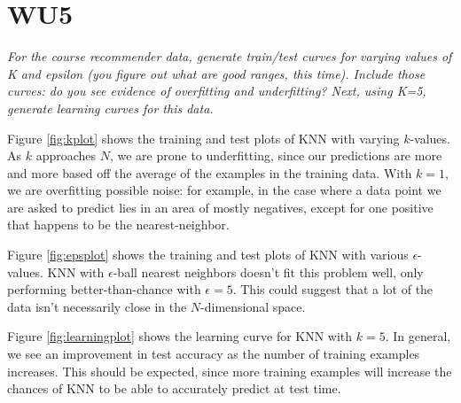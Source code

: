 \section*{WU5}

\textit{For the course recommender data, generate train/test curves for varying values of K and epsilon (you figure out what are good ranges, this time). Include those curves: do you see evidence of overfitting and underfitting? Next, using K=5, generate learning curves for this data.}

Figure \ref{fig:kplot} shows the training and test plots of KNN with varying $k$-values. As $k$ approaches $N$, we are prone to underfitting, since our predictions are more and more based off the average of the examples in the training data. With $k=1$, we are overfitting possible noise: for example, in the case where a data point we are asked to predict lies in an area of mostly negatives, except for one positive that happens to be the nearest-neighbor.

Figure \ref{fig:epsplot} shows the training and test plots of KNN with various $\epsilon$-values. KNN with $\epsilon$-ball nearest neighbors doesn't fit this problem well, only performing better-than-chance with $\epsilon=5$. This could suggest that a lot of the data isn't necessarily close in the $N$-dimensional space.

Figure \ref{fig:learningplot} shows the learning curve for KNN with $k=5$. In general, we see an improvement in test accuracy as the number of training examples increases. This should be expected, since more training examples will increase the chances of KNN to be able to accurately predict at test time.

